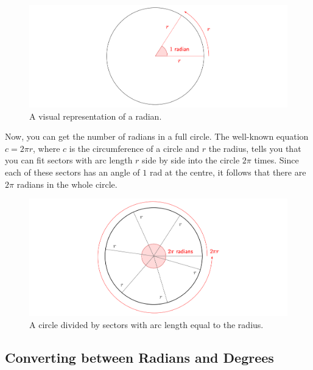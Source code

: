 \documentclass[
  12pt,
  a4paper, oneside]{starmastarticle}
\begin{document}
\begin{figure}

{\centering \includegraphics[width=1.5\textwidth,height=\textheight]{./FiguresPNG/radians-radian.png}

}

\caption{A visual representation of a radian.}

\end{figure}

Now, you can get the number of radians in a full circle. The well-known
equation \(c = 2 \pi r\), where \(c\) is the circumference of a circle
and \(r\) the radius, tells you that you can fit sectors with arc length
\(r\) side by side into the circle \(2\pi\) times. Since each of these
sectors has an angle of \(1\) rad at the centre, it follows that there
are \(2\pi\) radians in the whole circle.

\begin{figure}

{\centering \includegraphics[width=1.5\textwidth,height=\textheight]{./FiguresPNG/radians-circle-divided.png}

}

\caption{A circle divided by sectors with arc length equal to the
radius.}

\end{figure}

\hypertarget{converting-between-radians-and-degrees}{%
\subsection{Converting between Radians and
Degrees}\label{converting-between-radians-and-degrees}}
\end{document}

